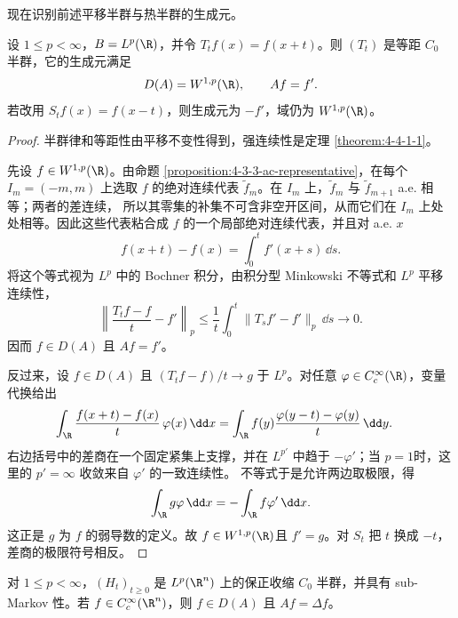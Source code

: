 现在识别前述平移半群与热半群的生成元。

\begin{proposition}[平移生成元的双向识别]
\label{proposition:4-4-3-translation-generator}
设 $1\le p<\infty$，$B=L^p(\R)$，并令 $T_tf(x)=f(x+t)$。则 $(T_t)$ 是等距
$C_0$ 半群，它的生成元满足
\[
  D(A)=W^{1,p}(\R),\qquad Af=f'.
\]
若改用 $S_tf(x)=f(x-t)$，则生成元为 $-f'$，域仍为
$W^{1,p}(\R)$。
\end{proposition}

\begin{proof}
半群律和等距性由平移不变性得到，强连续性是定理
\ref{theorem:4-4-1-1}。

先设 $f\in W^{1,p}(\R)$。由命题
\ref{proposition:4-3-3-ac-representative}，在每个 $I_m=(-m,m)$ 上选取 $f$ 的绝对连续代表
$\widetilde f_m$。在 $I_m$ 上，$\widetilde f_m$ 与 $\widetilde f_{m+1}$ a.e. 相等；两者的差连续，
所以其零集的补集不可含非空开区间，从而它们在 $I_m$ 上处处相等。因此这些代表粘合成
$f$ 的一个局部绝对连续代表，并且对 a.e. $x$
\[
 f(x+t)-f(x)=\int_0^t f'(x+s)\,\dd s.
\]
将这个等式视为 $L^p$ 中的 Bochner 积分，由积分型 Minkowski
不等式和 $L^p$ 平移连续性，
\[
 \left\|\frac{T_tf-f}{t}-f'\right\|_p
 \le\frac1t\int_0^t\|T_sf'-f'\|_p\,\dd s
 \longrightarrow0.
\]
因而 $f\in D(A)$ 且 $Af=f'$。

反过来，设 $f\in D(A)$ 且
$(T_tf-f)/t\to g$ 于 $L^p$。对任意 $\varphi\in C_c^\infty(\R)$，变量代换给出
\begin{align*}
 \int_\R\frac{f(x+t)-f(x)}t\,\varphi(x)\,\dd x
 &=\int_\R f(y)\frac{\varphi(y-t)-\varphi(y)}t\,\dd y.
\end{align*}
右边括号中的差商在一个固定紧集上支撑，并在
$L^{p'}$ 中趋于 $-\varphi'$；当 $p=1$时，这里的 $p'=\infty$
收敛来自 $\varphi'$ 的一致连续性。\Holder{} 不等式于是允许两边取极限，得
\[
 \int_\R g\varphi\,\dd x=-\int_\R f\varphi'\,\dd x.
\]
这正是 $g$ 为 $f$ 的弱导数的定义。故 $f\in W^{1,p}(\R)$且
$f'=g$。对 $S_t$ 把 $t$ 换成 $-t$，差商的极限符号相反。
\end{proof}

\begin{proposition}[热半群在测试函数上的生成元]
\label{proposition:4-4-3-heat-test-generator}
对 $1\le p<\infty$，$(H_t)_{t\ge0}$ 是 $L^p(\R^n)$ 上的保正收缩
$C_0$ 半群，并具有 sub-Markov 性。若 $f\in C_c^\infty(\R^n)$，则
$f\in D(A)$ 且 $Af=\Delta f$。
\end{proposition}

